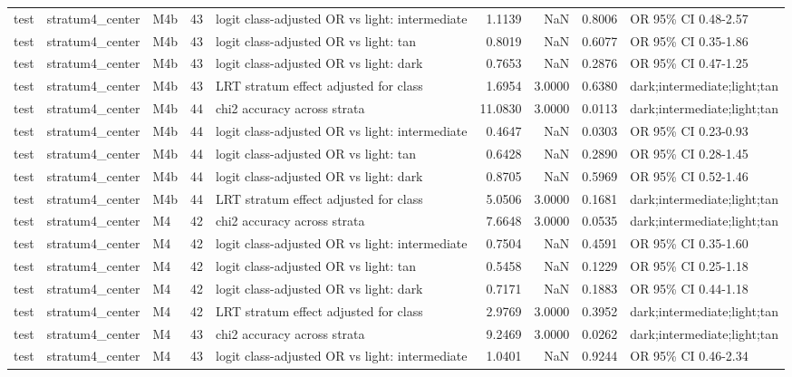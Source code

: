 \begin{tabular}{lllrlrrrl}
test & stratum4\_center & M4b & 43 & logit class-adjusted OR vs light: intermediate & 1.1139 & NaN & 0.8006 & OR 95\% CI 0.48-2.57 \\
test & stratum4\_center & M4b & 43 & logit class-adjusted OR vs light: tan & 0.8019 & NaN & 0.6077 & OR 95\% CI 0.35-1.86 \\
test & stratum4\_center & M4b & 43 & logit class-adjusted OR vs light: dark & 0.7653 & NaN & 0.2876 & OR 95\% CI 0.47-1.25 \\
test & stratum4\_center & M4b & 43 & LRT stratum effect adjusted for class & 1.6954 & 3.0000 & 0.6380 & dark;intermediate;light;tan \\
test & stratum4\_center & M4b & 44 & chi2 accuracy across strata & 11.0830 & 3.0000 & 0.0113 & dark;intermediate;light;tan \\
test & stratum4\_center & M4b & 44 & logit class-adjusted OR vs light: intermediate & 0.4647 & NaN & 0.0303 & OR 95\% CI 0.23-0.93 \\
test & stratum4\_center & M4b & 44 & logit class-adjusted OR vs light: tan & 0.6428 & NaN & 0.2890 & OR 95\% CI 0.28-1.45 \\
test & stratum4\_center & M4b & 44 & logit class-adjusted OR vs light: dark & 0.8705 & NaN & 0.5969 & OR 95\% CI 0.52-1.46 \\
test & stratum4\_center & M4b & 44 & LRT stratum effect adjusted for class & 5.0506 & 3.0000 & 0.1681 & dark;intermediate;light;tan \\
test & stratum4\_center & M4 & 42 & chi2 accuracy across strata & 7.6648 & 3.0000 & 0.0535 & dark;intermediate;light;tan \\
test & stratum4\_center & M4 & 42 & logit class-adjusted OR vs light: intermediate & 0.7504 & NaN & 0.4591 & OR 95\% CI 0.35-1.60 \\
test & stratum4\_center & M4 & 42 & logit class-adjusted OR vs light: tan & 0.5458 & NaN & 0.1229 & OR 95\% CI 0.25-1.18 \\
test & stratum4\_center & M4 & 42 & logit class-adjusted OR vs light: dark & 0.7171 & NaN & 0.1883 & OR 95\% CI 0.44-1.18 \\
test & stratum4\_center & M4 & 42 & LRT stratum effect adjusted for class & 2.9769 & 3.0000 & 0.3952 & dark;intermediate;light;tan \\
test & stratum4\_center & M4 & 43 & chi2 accuracy across strata & 9.2469 & 3.0000 & 0.0262 & dark;intermediate;light;tan \\
test & stratum4\_center & M4 & 43 & logit class-adjusted OR vs light: intermediate & 1.0401 & NaN & 0.9244 & OR 95\% CI 0.46-2.34 \\

\end{tabular}
